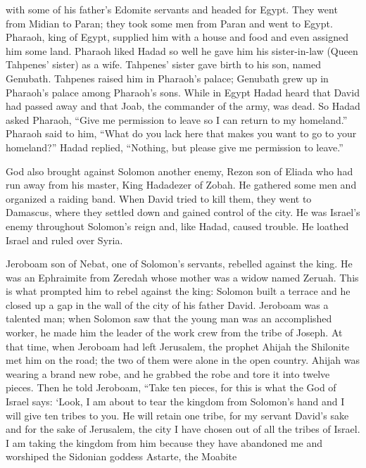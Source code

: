{with
some of his father’s
Edomite
servants
and headed
for Egypt.
They went
from Midian
to Paran;
they took
some men
from Paran
and went
to Egypt.
Pharaoh,
king
of Egypt,
supplied
him with
a house
and food
and even assigned
him some land.
Pharaoh
liked
Hadad
so well he gave
him his sister-in-law
(Queen
Tahpenes’
sister) as a wife.
Tahpenes’
sister
gave birth
to his son,
named Genubath.
Tahpenes
raised him in
Pharaoh’s
palace;
Genubath
grew up in Pharaoh’s
palace
among
Pharaoh’s
sons.
While in Egypt
Hadad
heard
that
David
had passed away
and that
Joab,
the commander
of the army,
was dead.
So Hadad
asked
Pharaoh,
“Give
me permission to leave
so I can return
to
my homeland.”
Pharaoh
said
to him, “What
do you
lack
here
that makes you want
to go
to your homeland?” Hadad replied, “Nothing,
but
please give me
permission to leave.”
\par }{\PP {}God
also brought
against Solomon another enemy,
Rezon
son
of Eliada
who
had run away
from his master,
King
Hadadezer
of Zobah.
He gathered
some men
and organized
a raiding band.
When David
tried to kill
them, they went
to Damascus,
where they settled down
and gained control
of the city.
He was
Israel’s
enemy
throughout
Solomon’s
reign
and, like Hadad,
caused
trouble.
He loathed
Israel
and ruled
over
Syria.
\par }{\PP {}Jeroboam
son
of Nebat,
one of Solomon’s
servants,
rebelled against the king.
He was an Ephraimite
from
Zeredah
whose mother
was a widow
named
Zeruah.
This
is what
prompted
him
to rebel
against the king: Solomon
built
a terrace
and he closed
up a gap
in the wall of the city
of his father
David.
Jeroboam
was a talented
man;
when Solomon
saw
that the young man
was an accomplished
worker,
he made him the leader
of the work crew
from the tribe
of Joseph.
At that time,
when Jeroboam
had left
Jerusalem,
the prophet
Ahijah
the Shilonite
met
him on the road;
the two
of them were alone
in the open country.
Ahijah was wearing a brand
new
robe,
and he
grabbed
the robe
and tore
it into twelve
pieces.
Then he told
Jeroboam,
“Take
ten
pieces,
for
this is what
the {}
God
of Israel
says: ‘Look,
I am about to tear
the kingdom
from Solomon’s
hand
and I will give
ten
tribes to you.
He will retain
one
tribe,
for
my servant
David’s
sake
and for the sake
of Jerusalem,
the city
I have chosen out
of all
the tribes
of Israel.
I am taking the kingdom from him because
they have abandoned
me and worshiped
the Sidonian
goddess
Astarte,
the Moabite
}

